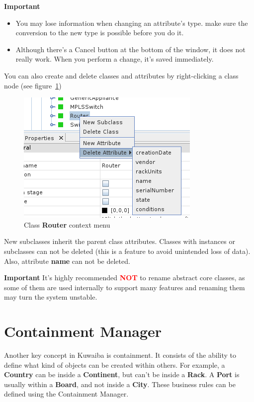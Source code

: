 \documentclass[a4paper]{article}
\begin{document}
		\begin{framed} {\large \textbf{Important}}
			\begin{itemize}
				\item You may lose information when changing an attribute's type. make sure the conversion to the new type is possible before you do it.
				\item Although there's a Cancel button at the bottom of the window, it does not	really work. When you perform a change, it's saved immediately.
			\end{itemize}
		\end{framed}
		You can also create and delete classes and attributes by right-clicking a class node (see figure~\ref{fig:class_node_menu})
		\begin{figure}[h!]
			\centering
			\includegraphics[width=0.4\linewidth]{img/class_node_menu.png}
			\caption{Class \textbf{Router} context menu}
			\label{fig:class_node_menu}
		\end{figure}
		New subclasses inherit the parent class attributes. Classes with instances or subclasses can not be deleted (this is  a  feature to avoid unintended loss of  data). Also, attribute \textbf{name} can not be deleted.
		\begin{framed} {\large \textbf{Important}}
			It's highly recommended \textbf{\textcolor{red}{NOT}} to rename abstract core classes, as some of them are used internally to support many features and renaming them may turn the system unstable.
		\end{framed}
		
	\newpage
	\section{Containment Manager} \label{sec:containment_manager}
	Another key concept in Kuwaiba is containment. It consists of the ability to define what kind of objects can be created within others. For example, a \textbf{Country} can be inside a \textbf{Continent}, but can't be inside a \textbf{Rack}. A \textbf{Port} is usually within a \textbf{Board}, and not inside a \textbf{City}. These business rules can be defined using the Containment Manager.
	
\end{document}
